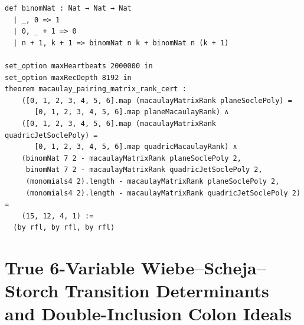 \documentclass[11pt,a4paper]{article}
\begin{document}
\begin{lstlisting}[caption={Explicit Macaulay pairing matrix builder and fraction-free Gaussian elimination in \texttt{ShiodaFormalConjectures.lean}.}]
def binomNat : Nat → Nat → Nat
  | _, 0 => 1
  | 0, _ + 1 => 0
  | n + 1, k + 1 => binomNat n k + binomNat n (k + 1)

set_option maxHeartbeats 2000000 in
set_option maxRecDepth 8192 in
theorem macaulay_pairing_matrix_rank_cert :
    ([0, 1, 2, 3, 4, 5, 6].map (macaulayMatrixRank planeSoclePoly) =
       [0, 1, 2, 3, 4, 5, 6].map planeMacaulayRank) ∧
    ([0, 1, 2, 3, 4, 5, 6].map (macaulayMatrixRank quadricJetSoclePoly) =
       [0, 1, 2, 3, 4, 5, 6].map quadricMacaulayRank) ∧
    (binomNat 7 2 - macaulayMatrixRank planeSoclePoly 2,
     binomNat 7 2 - macaulayMatrixRank quadricJetSoclePoly 2,
     (monomials4 2).length - macaulayMatrixRank planeSoclePoly 2,
     (monomials4 2).length - macaulayMatrixRank quadricJetSoclePoly 2) =
    (15, 12, 4, 1) :=
  ⟨by rfl, by rfl, by rfl⟩
\end{lstlisting}

\section{True 6-Variable Wiebe--Scheja--Storch Transition Determinants and Double-Inclusion Colon Ideals}
\end{document}
